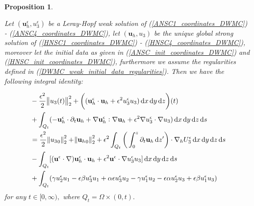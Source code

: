 \documentclass[12pt]{report}
\numberwithin{theorem}{chapter}
\numberwithin{corollary}{chapter}
\numberwithin{lemma}{chapter}
\numberwithin{remark}{chapter}
\numberwithin{definition}{chapter}
\newtheorem{prop}{Proposition}
\numberwithin{prop}{chapter}
\newcommand*\diff{\mathop{}\!\mathrm{d}}
\begin{document}
\begin{prop} \label{propIdentity}

Let $(\mathbf{u}_h^\epsilon, u_3^\epsilon)$ be a Leray-Hopf weak solution of (\ref{ANSC1_coordinates_DWMC}) - (\ref{ANSC4_coordinates_DWMC}), let $(\mathbf{u}_h,u_3)$ be the unique global strong solution of (\ref{HNSC1_coordinates_DWMC}) - (\ref{HNSC4_coordinates_DWMC}), moreover let the initial data as given in (\ref{ANSC_init_coordinates_DWMC}) and (\ref{HNSC_init_coordinates_DWMC}), furthermore we assume the regularities defined in (\ref{DWMC_weak_initial_data_regularities}). Then we have the following integral identity:

\begin{equation} \label{integralIdentity_prop}
  \begin{split}
    & - \frac{\epsilon^2}{2} \norm{u_3(t)}_2^2 + \bigg ( (\mathbf{u}_h^\epsilon \cdot \mathbf{u}_h + \epsilon^2 u_3^\epsilon u_3) \diff x \diff y \diff z  \bigg ) (t) \\
    & + \int_{Q_t} (-\mathbf{u}_h^\epsilon \cdot \partial_t \mathbf{u}_h + \nabla \mathbf{u}_h^\epsilon : \nabla \mathbf{u}_h + \epsilon^2 \nabla u_3^\epsilon \cdot \nabla u_3) \diff x \diff y \diff z \diff s \\
    & = \frac{\epsilon^2}{2} \norm{{u_3}_0}_2^2 + \norm{{\mathbf{u}_h}_0}_2^2 + \epsilon^2 \int_{Q_t} \bigg ( \int_0^z \partial_t \mathbf{u}_h \diff z' \bigg ) \cdot \nabla_h U_3^\epsilon \diff x \diff y \diff z \diff s \\
    & - \int_{Q_t} [(\mathbf{u}^\epsilon \cdot \nabla) \mathbf{u}_h^\epsilon \cdot \mathbf{u}_h + \epsilon^2 \mathbf{u}^\epsilon \cdot \nabla u_3^\epsilon u_3] \diff x \diff y \diff z \diff s \\
    & + \int_{Q_t}  ( \gamma u_2^\epsilon u_1 - \epsilon \beta u_3^\epsilon u_1 + \alpha \epsilon u_3^\epsilon u_2 - \gamma u_1^\epsilon u_2 - \epsilon \alpha u^\epsilon_2 u_3 + \epsilon \beta u_1^\epsilon u_3)
  \end{split}
\end{equation}
%
for any $t \in [0, \infty),$ where $Q_t = \Omega \times (0,t).$

\end{prop}
\end{document}
